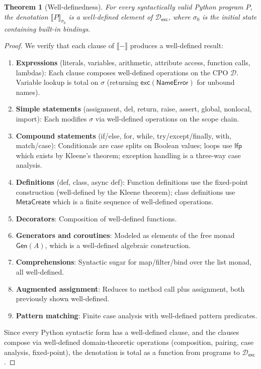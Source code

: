 \documentclass[11pt,a4paper]{report}
\theoremstyle{definition}
\theoremstyle{plain}
\newtheorem{theorem}[definition]{Theorem}
\newcommand{\den}[1]{\llbracket #1 \rrbracket}
\begin{document}
\begin{theorem}[Well-definedness]
\label{thm:well-defined}
For every syntactically valid Python program $P$, the denotation
$\den{P}_{\sigma_0}$ is a well-defined element of $\mathcal{D}_\mathsf{exc}$,
where $\sigma_0$ is the initial state containing built-in bindings.
\end{theorem}
\begin{proof}
We verify that each clause of $\den{-}$ produces a well-defined result:

\begin{enumerate}
  \item \textbf{Expressions} (literals, variables, arithmetic, attribute access,
    function calls, lambdas): Each clause composes well-defined operations
    on the CPO $\mathcal{D}$.  Variable lookup is total on $\sigma$ (returning
    $\mathsf{exc}(\mathsf{NameError})$ for unbound names).

  \item \textbf{Simple statements} (assignment, del, return, raise, assert,
    global, nonlocal, import): Each modifies $\sigma$ via well-defined
    operations on the scope chain.

  \item \textbf{Compound statements} (if/else, for, while, try/except/finally,
    with, match/case): Conditionals are case splits on Boolean values; loops
    use $\mathsf{lfp}$ which exists by Kleene's theorem; exception handling
    is a three-way case analysis.

  \item \textbf{Definitions} (def, class, async def): Function definitions
    use the fixed-point construction (well-defined by the Kleene theorem);
    class definitions use $\mathsf{MetaCreate}$ which is a finite sequence
    of well-defined operations.

  \item \textbf{Decorators}: Composition of well-defined functions.

  \item \textbf{Generators and coroutines}: Modeled as elements of the free
    monad $\mathsf{Gen}(A)$, which is a well-defined algebraic construction.

  \item \textbf{Comprehensions}: Syntactic sugar for map/filter/bind over
    the list monad, all well-defined.

  \item \textbf{Augmented assignment}: Reduces to method call plus assignment,
    both previously shown well-defined.

  \item \textbf{Pattern matching}: Finite case analysis with well-defined
    pattern predicates.
\end{enumerate}

Since every Python syntactic form has a well-defined clause, and the clauses
compose via well-defined domain-theoretic operations (composition, pairing,
case analysis, fixed-point), the denotation is total as a function from
programs to $\mathcal{D}_\mathsf{exc}$.
\end{proof}
\end{document}
